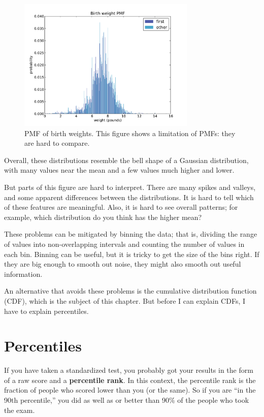 \documentclass[12pt]{book}
\begin{document}
\begin{figure}
\centerline{\includegraphics[height=2.5in]{figs/nsfg_birthwgt_pmf.pdf}}
\caption{PMF of birth weights.  This figure shows a limitation
of PMFs: they are hard to compare.}
\label{nsfg_birthwgt_pmf}
\end{figure}

Overall, these distributions resemble the bell shape of a Gaussian
distribution, with many values near the mean and a few values much
higher and lower.

But parts of this figure are hard to interpret.  There are many spikes
and valleys, and some apparent differences between the distributions.
It is hard to tell which of these features are meaningful.  Also, it
is hard to see overall patterns; for example, which distribution do
you think has the higher mean?

These problems can be mitigated by binning the data; that is, dividing
the range of values into non-overlapping intervals and counting the
number of values in each bin.  Binning can be useful, but it is tricky
to get the size of the bins right.  If they are big enough to smooth
out noise, they might also smooth out useful information.

An alternative that avoids these problems is the cumulative
distribution function (CDF), which is the subject of this chapter.
But before I can explain CDFs, I have to explain percentiles.


\section{Percentiles}

If you have taken a standardized test, you probably got your
results in the form of a raw score and a {\bf percentile rank}.
In this context, the percentile rank is the fraction of people who
scored lower than you (or the same).  So if you are ``in the 90th
percentile,'' you did as well as or better than 90\% of the people who
took the exam.
\end{document}
